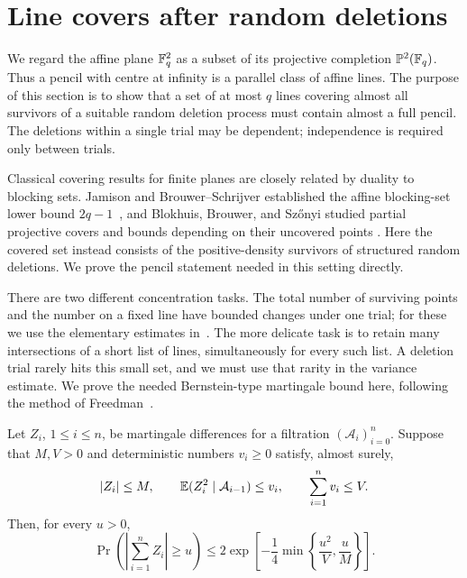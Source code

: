 \section{Line covers after random deletions}\label{sec:linecover}

We regard the affine plane $\mathbb F_q^2$ as a subset of its projective
completion $\mathbb P^2(\mathbb F_q)$. Thus a pencil with centre at infinity is a
parallel class of affine lines. The purpose of this section is to show
that a set of at most $q$ lines covering almost all survivors of a
suitable random deletion process must contain almost a full pencil.
The deletions within a single trial may be dependent; independence is
required only between trials.

Classical covering results for finite planes are closely related by
duality to blocking sets. Jamison and Brouwer--Schrijver established the
affine blocking-set lower bound $2q-1$~\cite{Jamison1977,BrouwerSchrijver1978},
and Blokhuis, Brouwer, and Sz\H{o}nyi studied partial projective covers
and bounds depending on their uncovered points
\cite[Section 1.1, Proposition 1.5]{BBS2010}. Here the covered set instead consists of the
positive-density survivors of structured random deletions. We prove the
pencil statement needed in this setting directly.

There are two different concentration tasks. The total number of
surviving points and the number on a fixed line have bounded changes
under one trial; for these we use the elementary estimates
in~\cite[Lemmas~A.2--A.3]{OpenAI2026Balanced}. The more delicate task
is to retain many intersections of a short list of lines, simultaneously
for every such list. A deletion trial rarely hits this small set, and
we must use that rarity in the variance estimate. We prove the needed
Bernstein-type martingale bound here, following the method of
Freedman~\cite[Theorem (1.6) and Proposition (2.1)]{Freedman1975}.

\begin{lemma}\label{lem:martingale}
Let $Z_i$, $1\leq i\leq n$, be martingale differences for a filtration
$(\mathcal A_i)_{i=0}^n$. Suppose that $M,V>0$ and deterministic numbers
$v_i\geq0$ satisfy, almost surely,
\[
 |Z_i|\leq M,\qquad
 \mathbb E(Z_i^2\mid\mathcal A_{i-1})\leq v_i,\qquad
 \sum_{i=1}^n v_i\leq V.
\]
Then, for every $u>0$,
\begin{equation}\label{eq:lc-martingale}
 \Pr\left(\left|\sum_{i=1}^n Z_i\right|\geq u\right)
 \leq 2\exp\left[-\frac14
   \min\left\{\frac{u^2}{V},\frac{u}{M}\right\}\right].
\end{equation}
\end{lemma}

